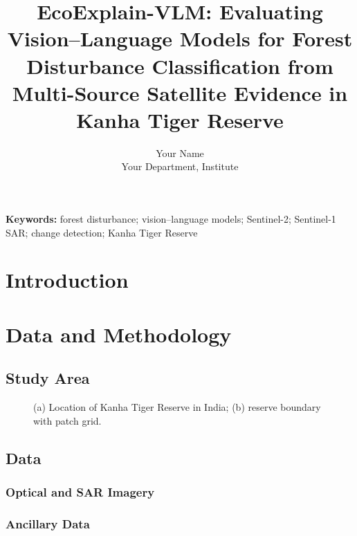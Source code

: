 \documentclass[12pt]{article}
\title{EcoExplain-VLM: Evaluating Vision--Language Models for Forest Disturbance
Classification from Multi-Source Satellite Evidence in Kanha Tiger Reserve}
\author{Your Name \\ Your Department, Institute}
\date{}
\begin{document}
\maketitle

\begin{abstract}
\end{abstract}

\noindent\textbf{Keywords:} forest disturbance; vision--language models; Sentinel-2;
Sentinel-1 SAR; change detection; Kanha Tiger Reserve

\section{Introduction}

\section{Data and Methodology}

\subsection{Study Area}
\begin{figure}[H]
  \centering
  \caption{(a) Location of Kanha Tiger Reserve in India; (b) reserve boundary with patch grid.}
  \label{fig:study_area}
\end{figure}

\subsection{Data}
\subsubsection{Optical and SAR Imagery}

\subsubsection{Ancillary Data}
\end{document}
